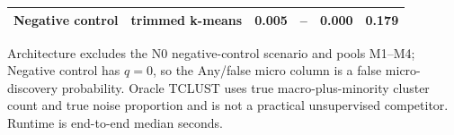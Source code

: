 \begin{table}[!htbp]
\begin{tabular}{llrrrr}
Negative control & trimmed k-means & 0.005 & -- & 0.000 & 0.179 \\
\hline
\end{tabular}
\begin{flushleft}\footnotesize Architecture excludes the N0 negative-control scenario and pools M1--M4; Negative control has $q=0$, so the Any/false micro column is a false micro-discovery probability. Oracle TCLUST uses true macro-plus-minority cluster count and true noise proportion and is not a practical unsupervised competitor. Runtime is end-to-end median seconds. \end{flushleft}
\end{table}
